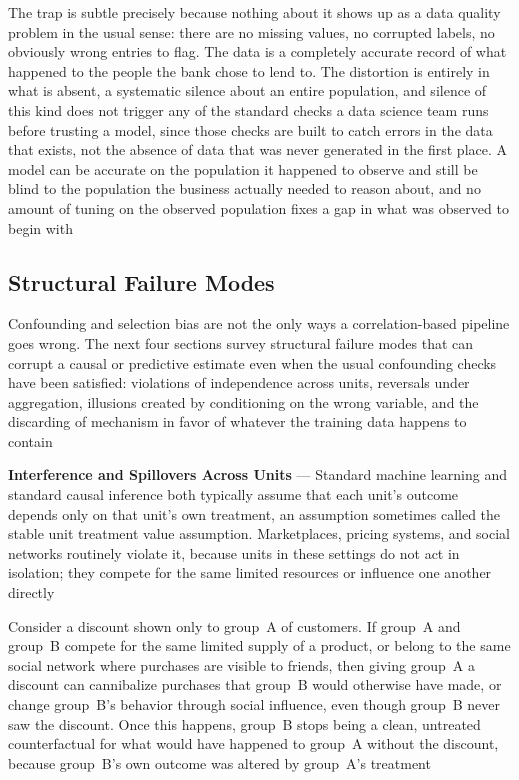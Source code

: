 The trap is subtle precisely because nothing about it shows up as a data quality
problem in the usual sense: there are no missing values, no corrupted labels, no
obviously wrong entries to flag. The data is a completely accurate record of
what happened to the people the bank chose to lend to. The distortion is entirely
in what is absent, a systematic silence about an entire population, and silence of
this kind does not trigger any of the standard checks a data science team runs before
trusting a model, since those checks are built to catch errors in the data that
exists, not the absence of data that was never generated in the first place. A
model can be accurate on the population it happened to observe and still be
blind to the population the business actually needed to reason about, and no amount
of tuning on the observed population fixes a gap in what was observed to begin with

\subsection{Structural Failure Modes}
\label{sec:structural-failure-modes}

Confounding and selection bias are not the only ways a correlation-based pipeline
goes wrong. The next four sections survey structural failure modes that can
corrupt a causal or predictive estimate even when the usual confounding checks
have been satisfied: violations of independence across units, reversals under
aggregation, illusions created by conditioning on the wrong variable, and the
discarding of mechanism in favor of whatever the training data happens to
contain

\textbf{Interference and Spillovers Across Units} --- Standard machine learning
and standard causal inference both typically assume that each unit's outcome
depends only on that unit's own treatment, an assumption sometimes called the stable
unit treatment value assumption. Marketplaces, pricing systems, and social
networks routinely violate it, because units in these settings do not act in isolation;
they compete for the same limited resources or influence one another directly

Consider a discount shown only to group~A of customers. If group~A and group~B
compete for the same limited supply of a product, or belong to the same social network
where purchases are visible to friends, then giving group~A a discount can
cannibalize purchases that group~B would otherwise have made, or change group~B's
behavior through social influence, even though group~B never saw the discount. Once
this happens, group~B stops being a clean, untreated counterfactual for what would
have happened to group~A without the discount, because group~B's own outcome was
altered by group~A's treatment

